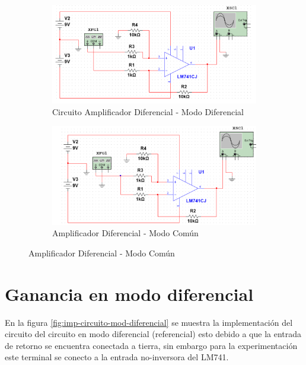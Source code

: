 \begin{figure}[h]
	\centering
	\begin{subfigure}[b]{0.45\linewidth}
		\centering
		\includegraphics[width=\linewidth]{media/circuito-mod-diferencial}
		\caption{Circuito Amplificador Diferencial - Modo Diferencial}
		\label{fig:circuito-mod-diferencial}	
	\end{subfigure}
	\hfill
	\begin{subfigure}[b]{0.45\linewidth}
		\centering
		\includegraphics[width=\linewidth]{media/circuito-mod-comun}
		\caption{Amplificador Diferencial - Modo Común}
		\label{fig:circuito-mod-comun}
	\end{subfigure}	
\end{figure}

\section{Ganancia en modo diferencial}

En la figura \ref{fig:imp-circuito-mod-diferencial} se muestra la implementación del circuito del circuito en modo diferencial (referencial) esto debido a que la entrada de retorno se encuentra conectada a tierra, sin embargo para la experimentación este terminal se conecto a la entrada no-inversora del LM741.


